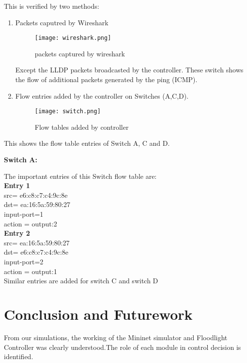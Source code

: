 \documentclass[12pt,a4paper]{article}
\begin{document}
This is verified by two methods:
\begin{enumerate}
\item Packets caputred by Wireshark
\begin{figure}[H]
\begin{center}

\texttt{[image: wireshark.png]}
\end{center}
\caption{packets captured by wireshark}
\end{figure}

Except the LLDP packets broadcasted by the controller. These switch shows the flow of additional packets generated by the ping (ICMP).
\newpage 

\item Flow entries added by the controller on Switches (A,C,D).
\begin{figure}[H]
\begin{center}

\texttt{[image: switch.png]}
\end{center}
\caption{Flow tables added by controller}
\end{figure}
\end{enumerate} 

This shows the flow table entries of Switch A, C and D.

\textbf{Switch A:}

The important entries of this Switch flow table are:\\

\textbf{Entry 1}\\
src= e6:c8:c7:c4:9c:8e\\
dst= ea:16:5a:59:80:27\\
input-port=1\\
action = output:2\\


\textbf{Entry 2}\\
src= ea:16:5a:59:80:27\\
dst= e6:c8:c7:c4:9c:8e\\
input-port=2\\
action = output:1 \\



Similar entries are added for switch C and switch D

\newpage
\section{Conclusion and Futurework}
From our simulations, the working of the Mininet simulator and Floodlight Controller was clearly understood.The role of each module in control decision is identified.
\end{document}
